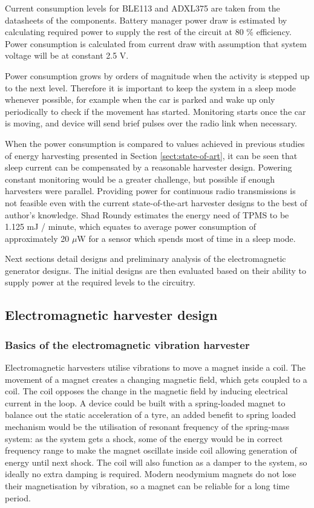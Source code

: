 Current consumption levels for BLE113 and ADXL375 are taken from the datasheets of the components. Battery manager power draw is estimated by calculating required power to supply the rest of the circuit at 80 \% efficiency. Power consumption is calculated from current draw with assumption that system voltage will be at constant 2.5 V.

Power consumption grows by orders of magnitude when the activity is stepped up to the next level. Therefore it is important to keep the system in a sleep mode whenever possible, for example when the car is parked and wake up only periodically to check if the movement has started. Monitoring starts once the car is moving, and device will send brief pulses over the radio link when necessary.

When the power consumption is compared to values achieved in previous studies of energy harvesting presented in Section \ref{sect:state-of-art}, it can be seen that sleep current can be compensated by a reasonable harvester design. Powering constant monitoring would be a greater challenge, but possible if enough harvesters were parallel. Providing power for continuous radio transmissions is not feasible even with the current state-of-the-art harvester designs to the best of author's knowledge. Shad Roundy \cite{Roundy2008} estimates the energy need of TPMS to be 1.125 mJ / minute, which equates to average power consumption of approximately 20 $\mu$W for a sensor which spends most of time in a sleep mode.

Next sections detail designs and preliminary analysis of the electromagnetic generator designs. The initial designs are then evaluated based on their ability to supply power at the required levels to the circuitry.

\subsection{Electromagnetic harvester design}\label{sect:emh_design}
\subsubsection{Basics of the electromagnetic vibration harvester}
Electromagnetic harvesters utilise vibrations to move a magnet inside a coil. The movement of a magnet creates a changing magnetic field, which gets coupled to a coil. The coil opposes the change in the magnetic field by inducing electrical current in the loop. A device could be built with a spring-loaded magnet to balance out the static acceleration of a tyre, an added benefit to spring loaded mechanism would be the utilisation of resonant frequency of the spring-mass system: as the system gets a shock, some of the energy would be in correct frequency range to make the magnet oscillate inside coil allowing generation of energy until next shock. The coil will also function as a damper to the system, so ideally no extra damping is required. Modern neodymium magnets do not lose their magnetisation by vibration, so a magnet can be reliable for a long time period. 

